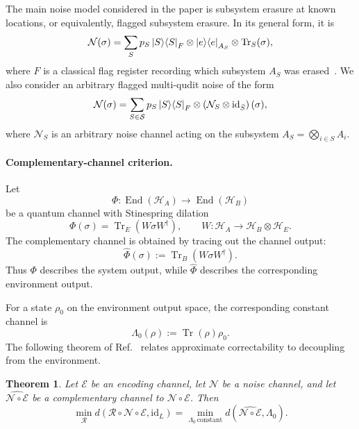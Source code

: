 \documentclass[10pt,twocolumn,superscriptaddress,aps,amsmath,amssymb,citeautoscript,floatfix,prx,longbibliography]{revtex4-2}
\newtheorem{theorem}{Theorem}
\theoremstyle{plain}
\theoremstyle{plain}
\theoremstyle{plain}
\theoremstyle{plain}
\theoremstyle{plain}
\theoremstyle{plain}
\begin{document}
The main noise model considered in the paper is subsystem erasure at known locations, or equivalently, flagged subsystem erasure. In its general form, it is
\begin{equation}\label{eq:erasure_noise}
    \mathcal N(\sigma)
    =
    \sum_S
    p_S
    \ket S\!\bra S_F
    \otimes
    \ket e\!\bra e_{A_S}
    \otimes
    \operatorname{Tr}_S(\sigma),
\end{equation}
where $F$ is a classical flag register recording which subsystem $A_S$ was erased~\cite{Faist2020}. We also consider an arbitrary flagged multi-qudit noise of the form
\begin{equation}\label{eq:arbitrary_multiqudit_noise}
    \mathcal N(\sigma)
    =
    \sum_{S\in\mathcal S}
    p_S
    \ket S\!\bra S_F
    \otimes
    \left(
        \mathcal N_S
        \otimes
        \mathrm{id}_{\bar S}
    \right)(\sigma),
\end{equation}
where $\mathcal N_S$ is an arbitrary noise channel acting on the subsystem $A_S=\bigotimes_{i\in S}A_i$.

\paragraph{Complementary-channel criterion.}
Let 
$$\Phi:\operatorname{End}(\mathcal H_A)\to\operatorname{End}(\mathcal H_B)
$$ 
be a quantum channel with Stinespring dilation
$$
\Phi(\sigma)
=
\operatorname{Tr}_E(W\sigma W^\dagger),
\qquad
W:\mathcal H_A\to\mathcal H_B\otimes\mathcal H_E .
$$
The complementary channel is obtained by tracing out the channel output:
$$
\widehat\Phi(\sigma)
:=
\operatorname{Tr}_B(W\sigma W^\dagger).
$$
Thus $\Phi$ describes the system output, while $\widehat\Phi$ describes the corresponding environment output.

For a state $\rho_0$ on the environment output space, the corresponding constant channel is
\begin{equation}\label{eq:constant_channel_def}
\Lambda_0(\rho)
:=
\operatorname{Tr}(\rho)\rho_0 .
\end{equation}
The following theorem of Ref.~\cite{Beny2010} relates approximate correctability to decoupling from the environment.

\begin{theorem}\label{thm:beny}
Let $\mathcal E$ be an encoding channel, let $\mathcal N$ be a noise channel, and let $\widehat{\mathcal N\circ\mathcal E}$ be a complementary channel to $\mathcal N\circ\mathcal E$. Then
\begin{equation}\label{eq:beny}
    \min_{\mathcal R}
    d\left(
        \mathcal R\circ\mathcal N\circ\mathcal E,
        \mathrm{id}_L
    \right)
    =
    \min_{\Lambda_0\,\mathrm{constant}}
    d\left(
        \widehat{\mathcal N\circ\mathcal E},
        \Lambda_0
    \right).
\end{equation}
\end{theorem}
\end{document}
